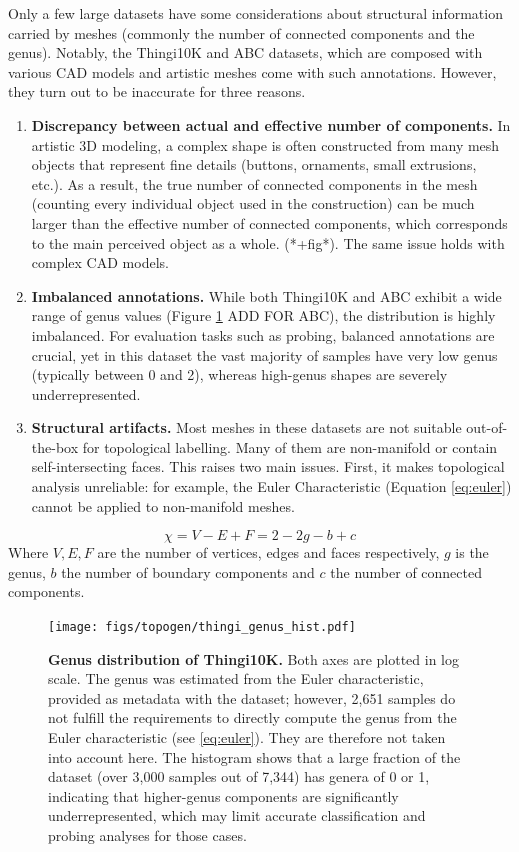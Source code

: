 Only a few large datasets have some considerations about structural information carried by meshes (commonly the number of connected components and the genus). Notably, the Thingi10K and ABC datasets, which are composed with various CAD models and artistic meshes come with such annotations. However, they turn out to be inaccurate for three reasons. 
\begin{enumerate}
  \item \textbf{Discrepancy between actual and effective number of components.} In artistic 3D modeling, a complex shape is often constructed from many mesh objects that represent fine details (buttons, ornaments, small extrusions, etc.). As a result, the true number of connected components in the mesh (counting every individual object used in the construction) can be much larger than the effective number of connected components, which corresponds to the main perceived object as a whole. (*+fig*). The same issue holds with complex CAD models.
  \item \textbf{Imbalanced annotations.} While both Thingi10K and ABC exhibit a wide range of genus values (Figure \ref{fig:thingi-genus} ADD FOR ABC), the distribution is highly imbalanced. For evaluation tasks such as probing, balanced annotations are crucial, yet in this dataset the vast majority of samples have very low genus (typically between 0 and 2), whereas high-genus shapes are severely underrepresented.
  \item \textbf{Structural artifacts.} Most meshes in these datasets are not suitable out-of-the-box for topological labelling. Many of them are non-manifold or contain self-intersecting faces. This raises two main issues. First, it makes topological analysis unreliable: for example, the Euler Characteristic (Equation \ref{eq:euler}) cannot be applied to non-manifold meshes.
\end{enumerate}
\begin{equation}
  \chi = V - E + F = 2 - 2g - b + c
  \label{eq:euler}
\end{equation}
Where $V, E, F$ are the number of vertices, edges and faces respectively, $g$ is the genus, $b$ the number of boundary components and $c$ the number of connected components.

\begin{figure}[t]
  \centering
  \texttt{[image: figs/topogen/thingi\_genus\_hist.pdf]}
   \caption{\textbf{Genus distribution of Thingi10K.} Both axes are plotted in log scale. The genus was estimated from the Euler characteristic, provided as metadata with the dataset; however, 2,651 samples do not fulfill the requirements to directly compute the genus from the Euler characteristic (see \ref{eq:euler}). They are therefore not taken into account here. The histogram shows that a large fraction of the dataset (over 3,000 samples out of 7,344) has genera of 0 or 1, indicating that higher-genus components are significantly underrepresented, which may limit accurate classification and probing analyses for those cases.}
   \label{fig:thingi-genus}
\end{figure}



